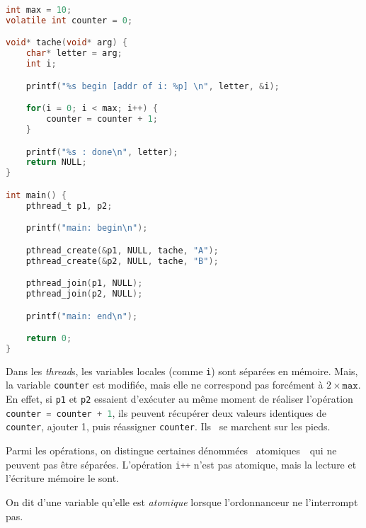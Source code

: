 \begin{lstlisting}[language=c,caption=Mémoire dans les \textit{thread}s en C]
int max = 10;
volatile int counter = 0;

void* tache(void* arg) {
	char* letter = arg;
	int i;

	printf("%s begin [addr of i: %p] \n", letter, &i);

	for(i = 0; i < max; i++) {
		counter = counter + 1;
	}

	printf("%s : done\n", letter);
	return NULL;
}

int main() {
	pthread_t p1, p2;

	printf("main: begin\n");

	pthread_create(&p1, NULL, tache, "A");
	pthread_create(&p2, NULL, tache, "B");

	pthread_join(p1, NULL);
	pthread_join(p2, NULL);

	printf("main: end\n");

	return 0;
}
\end{lstlisting}

Dans les \textit{thread}s, les variables locales (comme \texttt{i}) sont séparées en mémoire. Mais, la variable \texttt{counter} est modifiée, mais elle ne correspond pas forcément à $2 \times \texttt{max}$. En effet, si \texttt{p1} et \texttt{p2} essaient d'exécuter au même moment de réaliser l'opération \lstinline[language=c]-counter = counter + 1-, ils peuvent récupérer deux valeurs identiques de \texttt{counter}, ajouter 1, puis réassigner \texttt{counter}.
Ils \guillemotleft~se marchent sur les pieds.~\guillemotright\ 

Parmi les opérations, on distingue certaines dénommées \guillemotleft~atomiques~\guillemotright\ qui ne peuvent pas être séparées. L'opération \lstinline[language=c]-i++- n'est pas atomique, mais la lecture et l'écriture mémoire le sont.

\begin{defn}
	On dit d'une variable qu'elle est \textit{atomique} lorsque l'ordonnanceur ne l'interrompt pas.
\end{defn}

